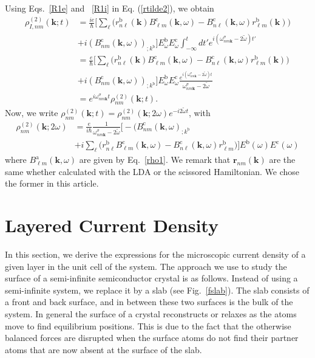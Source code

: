 Using Eqs.~\eqref{R1e} and ~\eqref{R1i} in Eq. (\ref{rtilde2}),
we obtain
\begin{align}\label{rtilde33}
\rho^{(2)}_{I,nm}(\mathbf{k};t)
&=
\frac{ie}{\hbar}
\bigg[
\sum_{\ell}
\Big(
r^{\mathrm{b}}_{n\ell}(\mathbf{k})
B^{\mathrm{c}}_{\ell m}(\mathbf{k},\omega)
-
B^{\mathrm{c}}_{n\ell}(\mathbf{k},\omega)
r^{\mathrm{b}}_{\ell m}(\mathbf{k})
\Big)
\nonumber \\
&+
i
(B^{\mathrm{c}}_{nm}(\mathbf{k},\omega))_{;k^{\mathrm{b}}}
\bigg]
E^{\mathrm{b}}_{\omega}E_{\omega}^{\mathrm{c}}
\int_{-\infty}^t dt'
e^{i(\omega^\sigma_{nm\mathbf{k}}-2\tilde{\omega})t'}
\nonumber \\
&=
\frac{e}{\hbar}
\bigg[
\sum_{\ell}
\Big(
r^{\mathrm{b}}_{n\ell}(\mathbf{k})
B^{\mathrm{c}}_{\ell m}(\mathbf{k},\omega)
-
B^{\mathrm{c}}_{n\ell}(\mathbf{k},\omega)
r^{\mathrm{b}}_{\ell m}(\mathbf{k})
\Big)
\nonumber \\
&+
i
(B^{\mathrm{c}}_{nm}(\mathbf{k},\omega))_{;k^{\mathrm{b}}}
\bigg]
E^{\mathrm{b}}_{\omega}E_{\omega}^{\mathrm{c}}
\frac{e^{i(\omega^\sigma_{nm\mathbf{k}}-2\tilde{\omega})t}}
{\omega^\sigma_{nm\mathbf{k}}-2\tilde{\omega}}
\nonumber \\
&=
e^{i\omega^\sigma_{nm\mathbf{k}}t}
\rho_{nm}^{(2)}(\mathbf{k};t)
.
\end{align}
Now, we write
$\rho_{nm}^{(2)}(\mathbf{k};t)=\rho_{nm}^{(2)}(\mathbf{k};2\omega)e^{-i2\tilde{\omega} t}$,
with
\begin{align}\label{rho2}
\rho_{nm}^{(2)}(\mathbf{k};2\omega)&=\frac{e}{i\hbar}\frac{1}{\omega^\sigma_{nm\mathbf{k}}-2\tilde{\omega}}
\bigg[-(B_{nm}^{\mathrm{c}}(\mathbf{k},\omega)_{;k^{\mathrm{b}}}
\nonumber \\
&
+i\sum_\ell\Big(r_{n\ell}^{\mathrm{b}}B_{\ell m}^{\mathrm{c}}(\mathbf{k},\omega) - B_{n\ell}^{\mathrm{c}}(\mathbf{k},\omega)
  r_{\ell m}^{\mathrm{b}}\Big)
\bigg] 
E^{\mathrm{b}}(\omega)E^{\mathrm{c}}(\omega)
\end{align} 
where 
$B_{\ell m}^{\mathrm{a}}(\mathbf{k},\omega)$ are given by Eq.~\eqref{rho1}. 
We remark that $\mathbf{r}_{nm}(\mathbf{k})$  are
the same whether calculated with the LDA or the scissored Hamiltonian. 
We chose the former in this article.

\section{Layered Current Density}\label{cd}

In this section, we derive the expressions for the microscopic current density
of a given layer in the unit cell of the system. The approach we use to study
the surface of a semi-infinite semiconductor crystal is as follows. Instead of
using a semi-infinite system, we replace it by a slab (see Fig.~\ref{fslab}).
The slab consists of a front and back surface, and in between these two surfaces
is the bulk of the system. In general the surface of a crystal reconstructs or
relaxes as the atoms move to find equilibrium positions. This is due to the fact
that the otherwise balanced forces are disrupted when the surface atoms do not
find their partner atoms that are now absent at the surface of the slab.

